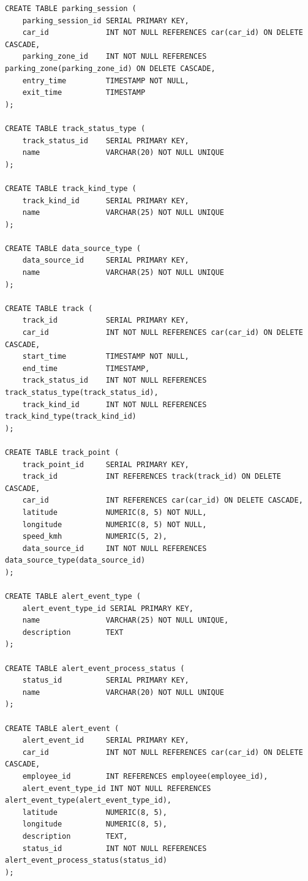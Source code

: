 \begin{lstlisting}[style=sqlstyle, caption={SQL-скрипт для создания схемы базы данных}, label={lst:schema}]
CREATE TABLE parking_session (
    parking_session_id SERIAL PRIMARY KEY,
    car_id             INT NOT NULL REFERENCES car(car_id) ON DELETE CASCADE,
    parking_zone_id    INT NOT NULL REFERENCES parking_zone(parking_zone_id) ON DELETE CASCADE,
    entry_time         TIMESTAMP NOT NULL,
    exit_time          TIMESTAMP
);

CREATE TABLE track_status_type (
    track_status_id    SERIAL PRIMARY KEY,
    name               VARCHAR(20) NOT NULL UNIQUE
);

CREATE TABLE track_kind_type (
    track_kind_id      SERIAL PRIMARY KEY,
    name               VARCHAR(25) NOT NULL UNIQUE
);

CREATE TABLE data_source_type (
    data_source_id     SERIAL PRIMARY KEY,
    name               VARCHAR(25) NOT NULL UNIQUE
);

CREATE TABLE track (
    track_id           SERIAL PRIMARY KEY,
    car_id             INT NOT NULL REFERENCES car(car_id) ON DELETE CASCADE,
    start_time         TIMESTAMP NOT NULL,
    end_time           TIMESTAMP,
    track_status_id    INT NOT NULL REFERENCES track_status_type(track_status_id),
    track_kind_id      INT NOT NULL REFERENCES track_kind_type(track_kind_id)
);

CREATE TABLE track_point (
    track_point_id     SERIAL PRIMARY KEY,
    track_id           INT REFERENCES track(track_id) ON DELETE CASCADE,
    car_id             INT REFERENCES car(car_id) ON DELETE CASCADE,
    latitude           NUMERIC(8, 5) NOT NULL,
    longitude          NUMERIC(8, 5) NOT NULL,
    speed_kmh          NUMERIC(5, 2),
    data_source_id     INT NOT NULL REFERENCES data_source_type(data_source_id)
);

CREATE TABLE alert_event_type (
    alert_event_type_id SERIAL PRIMARY KEY,
    name               VARCHAR(25) NOT NULL UNIQUE,
    description        TEXT
);

CREATE TABLE alert_event_process_status (
    status_id          SERIAL PRIMARY KEY,
    name               VARCHAR(20) NOT NULL UNIQUE
);

CREATE TABLE alert_event (
    alert_event_id     SERIAL PRIMARY KEY,
    car_id             INT NOT NULL REFERENCES car(car_id) ON DELETE CASCADE,
    employee_id        INT REFERENCES employee(employee_id),
    alert_event_type_id INT NOT NULL REFERENCES alert_event_type(alert_event_type_id),
    latitude           NUMERIC(8, 5),
    longitude          NUMERIC(8, 5),
    description        TEXT,
    status_id          INT NOT NULL REFERENCES alert_event_process_status(status_id)
);


\end{lstlisting}
